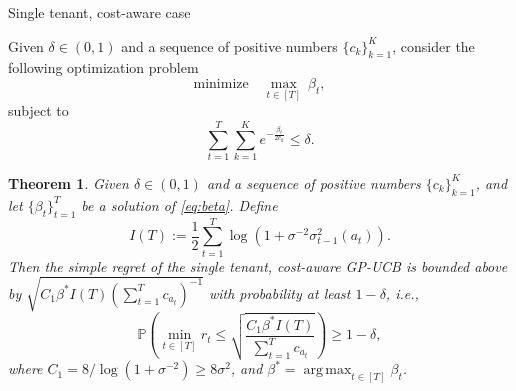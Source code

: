 \documentclass[letterpaper]{vldb}
\newtheorem{theorem}{Theorem}
\newcommand{\bP}{\mathbb{P}} %
\DeclareMathOperator*{\argmax}{arg\,max}
\begin{document}
{\color{red} Single tenant, cost-aware case}

Given $\delta\in (0,1)$ and a sequence of positive numbers $\{c_k\}_{k=1}^K$,
consider the following optimization problem
\begin{equation}
  \label{eq:beta}
  \text{minimize}\quad \max_{t\in [T]}~\beta_t,
\end{equation}
subject to
\[
  \sum_{t=1}^T\sum_{k = 1}^K e^{-\frac{\beta_t}{2c_k}}\le \delta.
\]

\begin{theorem}
  \label{thm:cost}
  Given $\delta\in (0,1)$ and a sequence of positive numbers $\{c_k\}_{k=1}^K$,
  and let $\{\beta_t\}_{t=1}^T$ be a solution of \eqref{eq:beta}. Define
  \[
  I(T) := \frac{1}{2}\sum_{t=1}^T\log(1+\sigma^{-2}\sigma^2_{t-1}(a_t)).
  \]
  Then the
  simple regret of the single tenant, cost-aware GP-UCB is bounded above by
  $\sqrt{C_1\beta^\ast I(T)(\sum_{t=1}^Tc_{a_t})^{-1}}$ with probability at
  least $1-\delta$, i.e.,
  \[
    \bP\left(\min_{t\in [T]}r_t \le \sqrt{\frac{C_1\beta^\ast I(T)}{\sum_{t=1}^T
        c_{a_t}}}\right) \ge 1-\delta,
\]
where $C_1 = 8/ \log(1+\sigma^{-2})\ge 8\sigma^2$, and $\beta^\ast =
\argmax_{t\in [T]}\beta_t$.
\end{theorem}



\newpage
\end{document}
